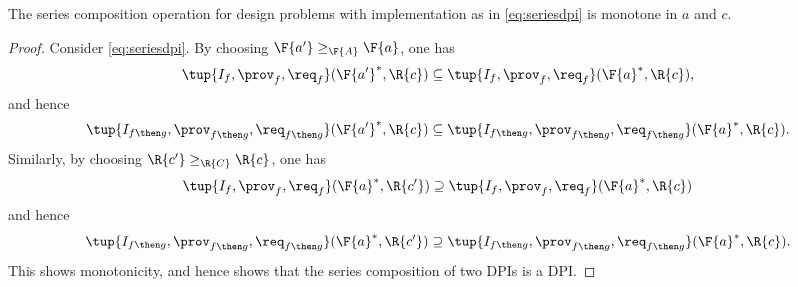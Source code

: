 \begin{lemma}
The series composition operation for design problems with implementation as in \cref{eq:seriesdpi} is monotone in $a$ and $c$.
\end{lemma}
\begin{proof}
Consider \cref{eq:seriesdpi}. By choosing $\F{a'}\geq_\F{A} \F{a}$, one has
\begin{equation}
    \tup{I_{f},\prov_{f},\req_{f}}(\F{a'}^*,\R{c})\subseteq \tup{I_{f},\prov_{f},\req_{f}}(\F{a}^*,\R{c}),
\end{equation}
and hence
\begin{equation}
    \tup{I_{f\then g},\prov_{f\then g},\req_{f\then g}}(\F{a'}^*,\R{c})\subseteq \tup{I_{f\then g},\prov_{f\then g},\req_{f\then g}}(\F{a}^*,\R{c}).
\end{equation}
Similarly, by choosing $\R{c'}\geq_{\R{C}} \R{c}$, one has
\begin{equation}
    \tup{I_{f},\prov_{f},\req_{f}}(\F{a}^*,\R{c'})\supseteq \tup{I_{f},\prov_{f},\req_{f}}(\F{a}^*,\R{c})
\end{equation}
and hence
\begin{equation}
    \tup{I_{f\then g},\prov_{f\then g},\req_{f\then g}}(\F{a}^*,\R{c'})\supseteq \tup{I_{f\then g},\prov_{f\then g},\req_{f\then g}}(\F{a}^*,\R{c}).
\end{equation}
This shows monotonicity, and hence shows that the series composition of two DPIs is a DPI.
\end{proof}

